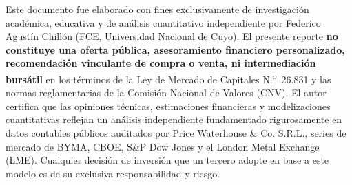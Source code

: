 \documentclass[10pt,a4paper]{article}
\begin{document}
\vspace{0.4cm}
\noindent
\begin{tcolorbox}[colback=lightgray!30, colframe=gsnavy, boxrule=0.8pt, arc=3pt, title={\small\sffamily \textbf{Aviso Legal y Certificación del Analista (Research Standards / Ley 26.831)}}, coltitle=white]
\scriptsize
Este documento fue elaborado con fines exclusivamente de investigación académica, educativa y de análisis cuantitativo independiente por Federico Agustín Chillón (FCE, Universidad Nacional de Cuyo). El presente reporte \textbf{no constituye una oferta pública, asesoramiento financiero personalizado, recomendación vinculante de compra o venta, ni intermediación bursátil} en los términos de la Ley de Mercado de Capitales N.\textsuperscript{o}~26.831 y las normas reglamentarias de la Comisión Nacional de Valores (CNV). El autor certifica que las opiniones técnicas, estimaciones financieras y modelizaciones cuantitativas reflejan un análisis independiente fundamentado rigurosamente en datos contables públicos auditados por Price Waterhouse \& Co. S.R.L., series de mercado de BYMA, CBOE, S\&P Dow Jones y el London Metal Exchange (LME). Cualquier decisión de inversión que un tercero adopte en base a este modelo es de su exclusiva responsabilidad y riesgo.
\end{tcolorbox}
\end{document}
